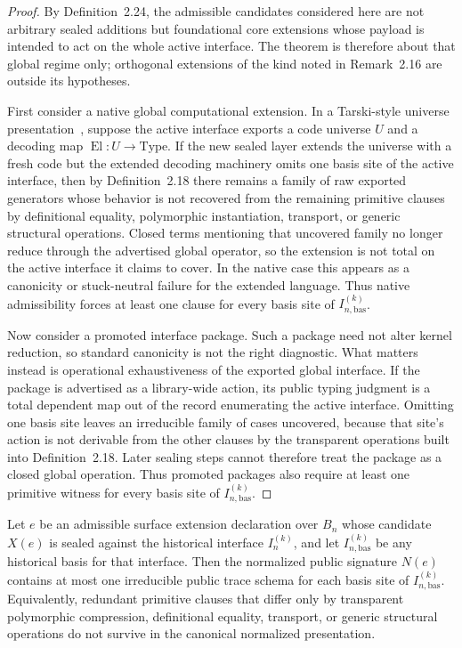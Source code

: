 \documentclass{lmcs}
\begin{document}
\begin{proof}
By Definition~2.24, the admissible candidates considered here are not arbitrary sealed
additions but foundational core extensions whose payload is intended to act on the whole
active interface.  The theorem is therefore about that global regime only; orthogonal
extensions of the kind noted in Remark~2.16 are outside its hypotheses.

First consider a native global computational extension.  In a Tarski-style universe
presentation~\cite{martinlof-itt}, suppose the active interface exports a code universe \(U\)
and a decoding map
\(\operatorname{El}:U\to\mathrm{Type}\).  If the new sealed layer extends the universe with a
fresh code but the extended decoding machinery omits one basis site of the active interface,
then by Definition~2.18 there remains a family of raw exported generators whose behavior is
not recovered from the remaining primitive clauses by definitional equality, polymorphic
instantiation, transport, or generic structural operations.  Closed terms mentioning that
uncovered family no longer reduce through the advertised global operator, so the extension
is not total on the active interface it claims to cover.  In the native case this appears as a
canonicity or stuck-neutral failure for the extended language.  Thus native admissibility
forces at least one clause for every basis site of \(I_{n,\mathrm{bas}}^{(k)}\).

Now consider a promoted interface package.  Such a package need not alter kernel reduction,
so standard canonicity is not the right diagnostic.  What matters instead is operational
exhaustiveness of the exported global interface.  If the package is advertised as a
library-wide action, its public typing judgment is a total dependent map out of the record
enumerating the active interface.  Omitting one basis site leaves an irreducible family of
cases uncovered, because that site's action is not derivable from the other clauses by the
transparent operations built into Definition~2.18.  Later sealing steps cannot therefore treat
the package as a closed global operation.  Thus promoted packages also require at least one
primitive witness for every basis site of \(I_{n,\mathrm{bas}}^{(k)}\).
\end{proof}

\begin{prop}
Let \(e\) be an admissible surface extension declaration over \(B_n\) whose candidate
\(X(e)\) is sealed against the historical interface \(I_n^{(k)}\), and let
\(I_{n,\mathrm{bas}}^{(k)}\) be any historical basis for that interface.  Then the normalized public
signature \(N(e)\) contains at most one irreducible public trace schema for each basis site of
\(I_{n,\mathrm{bas}}^{(k)}\).  Equivalently, redundant primitive clauses that differ only by
transparent polymorphic compression, definitional equality, transport, or generic structural
operations do not survive in the canonical normalized presentation.
\end{prop}
\end{document}

